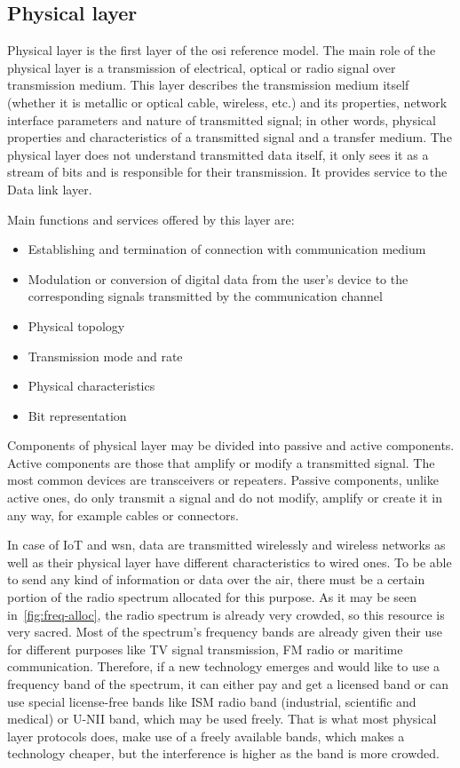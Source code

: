 \subsection{Physical layer}

Physical layer is the first layer of the \acrshort{osi} reference model. The main role of the physical layer is a transmission of electrical, optical or radio signal over transmission medium. This layer describes the transmission medium itself (whether it is metallic or optical cable, wireless, etc.) and its properties, network interface parameters and nature of transmitted signal; in other words, physical properties and characteristics of a transmitted signal and a transfer medium. The physical layer does not understand transmitted data itself, it only sees it as a stream of bits and is responsible for their transmission. It provides service to the Data link layer.

Main functions and services offered by this layer are:
\begin{itemize}[noitemsep]
    \item Establishing and termination of connection with communication medium
    \item Modulation or conversion of digital data from the user’s device to the corresponding signals transmitted by the communication channel
    \item Physical topology
    \item Transmission mode and rate
    \item Physical characteristics
    \item Bit representation
\end{itemize}

Components of physical layer may be divided into passive and active components. Active components are those that amplify or modify a transmitted signal. The most common devices are transceivers or repeaters. Passive components, unlike active ones, do only transmit a signal and do not modify, amplify or create it in any way, for example cables or connectors.

In case of IoT and \acrfull{wsn}, data are transmitted wirelessly and wireless networks as well as their physical layer have different characteristics to wired ones. To be able to send any kind of information or data over the air, there must be a certain portion of the radio spectrum allocated for this purpose. As it may be seen in~\ref{fig:freq-alloc}, the radio spectrum is already very crowded, so this resource is very sacred. Most of the spectrum’s frequency bands are already given their use for different purposes like TV signal transmission, FM radio or maritime communication. Therefore, if a new technology emerges and would like to use a frequency band of the spectrum, it can either pay and get a licensed band or can use special license-free bands like ISM radio band (industrial, scientific and medical) or U-NII band, which may be used freely. That is what most physical layer protocols does, make use of a freely available bands, which makes a technology cheaper, but the interference is higher as the band is more crowded.

